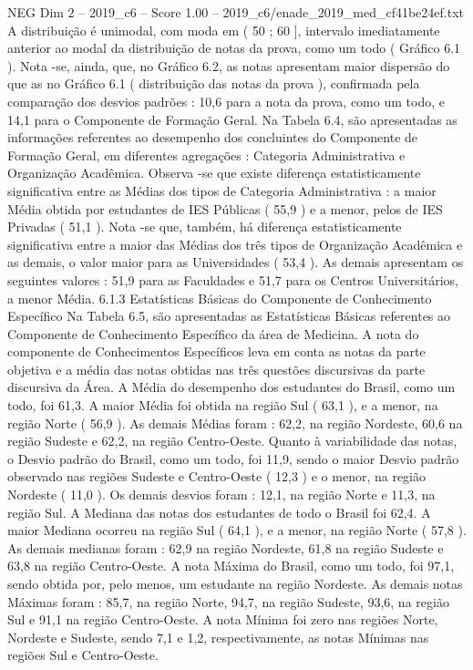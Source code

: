 \begin{textsample}{NEG Dim 2 – 2019\_c6 – Score 1.00 – 2019\_c6/enade\_2019\_med\_cf41be24ef.txt}
A distribuição é unimodal, com moda em ( 50 ; 60 ], intervalo imediatamente anterior ao modal da distribuição de notas da prova, como um todo ( Gráfico 6.1 ).
Nota -se, ainda, que, no Gráfico 6.2, as notas apresentam maior dispersão do que as no Gráfico 6.1 ( distribuição das notas da prova ), confirmada pela comparação dos desvios padrões : 10,6 para a nota da prova, como um todo, e 14,1 para o Componente de Formação Geral.
Na Tabela 6.4, são apresentadas as informações referentes ao desempenho dos concluintes do Componente de Formação Geral, em diferentes agregações : Categoria Administrativa e Organização Acadêmica.
Observa -se que existe diferença estatisticamente significativa entre as Médias dos tipos de Categoria Administrativa : a maior Média obtida por estudantes de IES Públicas ( 55,9 ) e a menor, pelos de IES Privadas ( 51,1 ).
Nota -se que, também, há diferença estatisticamente significativa entre a maior das Médias dos três tipos de Organização Acadêmica e as demais, o valor maior para as Universidades ( 53,4 ).
As demais apresentam os seguintes valores : 51,9 para as Faculdades e 51,7 para os Centros Universitários, a menor Média. 6.1.3 Estatísticas Básicas do Componente de Conhecimento Específico Na Tabela 6.5, são apresentadas as Estatísticas Básicas referentes ao Componente de Conhecimento Específico da área de Medicina.
A nota do componente de Conhecimentos Específicos leva em conta as notas da parte objetiva e a média das notas obtidas nas três questões discursivas da parte discursiva da Área.
A Média do desempenho dos estudantes do Brasil, como um todo, foi 61,3.
A maior Média foi obtida na região Sul ( 63,1 ), e a menor, na região Norte ( 56,9 ).
As demais Médias foram : 62,2, na região Nordeste, 60,6 na região Sudeste e 62,2, na região Centro-Oeste.
Quanto à variabilidade das notas, o Desvio padrão do Brasil, como um todo, foi 11,9, sendo o maior Desvio padrão observado nas regiões Sudeste e Centro-Oeste ( 12,3 ) e o menor, na região Nordeste ( 11,0 ).
Os demais desvios foram : 12,1, na região Norte e 11,3, na região Sul.
A Mediana das notas dos estudantes de todo o Brasil foi 62,4.
A maior Mediana ocorreu na região Sul ( 64,1 ), e a menor, na região Norte ( 57,8 ).
As demais medianas foram : 62,9 na região Nordeste, 61,8 na região Sudeste e 63,8 na região Centro-Oeste.
A nota Máxima do Brasil, como um todo, foi 97,1, sendo obtida por, pelo menos, um estudante na região Nordeste.
As demais notas Máximas foram : 85,7, na região Norte, 94,7, na região Sudeste, 93,6, na região Sul e 91,1 na região Centro-Oeste.
A nota Mínima foi zero nas regiões Norte, Nordeste e Sudeste, sendo 7,1 e 1,2, respectivamente, as notas Mínimas nas regiões Sul e Centro-Oeste.

\end{textsample}

